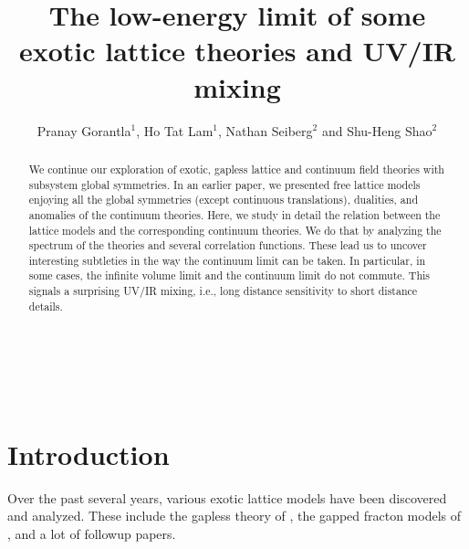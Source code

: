 \documentclass[12pt]{article}
\numberwithin{equation}{section}
\begin{document}
	
\begin{titlepage}
	
	\begin{center}
		
		\hfill \\
		\hfill \\
		\vskip 1cm
		
		
		\title{The low-energy limit of some exotic lattice theories and UV/IR mixing}
		
		\author{Pranay Gorantla$^{1}$, Ho Tat Lam$^{1}$, Nathan Seiberg$^{2}$ and Shu-Heng Shao$^{2}$}
		
		\address{${}^{1}$Physics Department, Princeton University, Princeton NJ, USA}
		\address{${}^{2}$School of Natural Sciences, Institute for Advanced Study, Princeton NJ, USA}

		
		
	\end{center}
	
	\vspace{2.0cm}
	
	\begin{abstract}\noindent
		We continue our exploration of exotic, gapless lattice and continuum field theories with subsystem  global symmetries.
		In an earlier paper, we presented free lattice models enjoying all the global symmetries (except continuous translations), dualities, and anomalies of the  continuum theories.
		Here, we study in detail the relation between the lattice models and the corresponding continuum theories.  We do that by analyzing the spectrum of the theories and  several correlation functions.  These lead us to uncover interesting subtleties in the way the continuum limit can be taken.  In particular, in some cases, the infinite volume limit and the continuum limit do not commute.  This signals a surprising UV/IR mixing, i.e., long distance sensitivity to short distance details.
	\end{abstract}
	
	\vfill
	
\end{titlepage}

\eject
	
	
\tableofcontents

\section{Introduction}



Over the past several years, various exotic lattice models have been discovered and analyzed.  These include the gapless theory of \cite{PhysRevB.66.054526}, the gapped fracton models of \cite{PhysRevLett.94.040402,PhysRevA.83.042330}, and a lot of followup papers.
\end{document}
